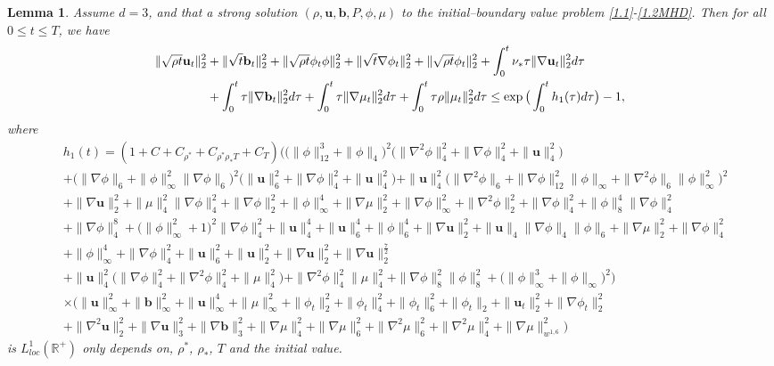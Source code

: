 \documentclass[11pt]{article}
\newtheorem{lemma}[theorem]{Lemma}
\numberwithin{equation}{section}
\begin{document}
\begin{lemma}\label{lemma3.2}
Assume \(d = 3\), and that a strong solution $(\rho,\mathbf{u},\mathbf{b},P,\phi,\mu)$ to the  initial--boundary value problem \eqref{1.1}-\eqref{1.2MHD}. Then for all \(0\leq t\leq T\), we have
\begin{align}\label{3D}
\|\sqrt{\rho t}\mathbf{u}_t\|_2^2&+\|\sqrt{t}\mathbf{b}_t\|_2^2+\|\sqrt{\rho t}\phi_t\phi\|_2^2+\|\sqrt{ t}\nabla\phi_t\|_2^2+\|\sqrt{\rho t}\phi_t\|_2^2
+\int_{0}^{t}\nu_*\tau\|\nabla \mathbf{u}_t\|_2^2d\tau\\ \notag
&+\int_{0}^{t}\tau\|\nabla \mathbf{b}_t\|_2^2d\tau+\int_{0}^{t}\tau\|\nabla\mu_t\|_2^2d\tau
+\int_{0}^{t}\tau\rho\|\mu_t\|_2^2d\tau
\leq\exp\big(\int_{0}^{t}h_1(\tau)d\tau\big)-1,
\end{align}
where
\begin{align*}
&h_1(t)=
(1 + C + C_{\rho^*} + C_{\rho^*\rho_*T} + C_T)
\Big(\big( \|\phi\|_{12}^3 + \|\phi\|_4 \big)^2
\big( \|\nabla^2 \phi\|_4^2 + \|\nabla \phi\|_4^2 + \|\mathbf{u}\|_4^2 \big) \\
&+ \big( \|\nabla \phi\|_6 + \|\phi\|_\infty^2 \|\nabla\phi\|_6 \big)^2
\big( \|\mathbf{u}\|_6^2 + \|\nabla\phi\|_4^2  + \|\mathbf{u}\|_4^2 \big) + \|\mathbf{u}\|_4^2 \big( \|\nabla^2 \phi\|_6 + \|\nabla \phi\|_{12}^2 \|\phi\|_\infty + \|\nabla^2 \phi\|_6 \|\phi\|_\infty^2 \big)^2 \\
&+ \|\nabla \mathbf{u}\|_2^2 + \| \mu\|_4^2 \|\nabla \phi\|_4^2 + \|\nabla \phi\|_2^2 + \|\phi\|_\infty^4 + \|\nabla \mu\|_2^2 + \|\nabla \phi\|_\infty^2
 + \|\nabla^2 \phi\|_2^2 + \|\nabla \phi\|_4^2 + \|\phi\|_8^4 \|\nabla\phi\|_4^2 \\
&+ \|\nabla \phi\|_4^8 + \big( \|\phi\|_\infty^2 + 1 \big)^2 \|\nabla \phi\|_4^2 + \|\mathbf{u}\|_4^4 + \|\mathbf{u}\|_6^4 + \|\phi\|_6^4 + \|\nabla \mathbf{u}\|_2^2  + \|\mathbf{u}\|_4 \|\nabla \phi\|_4 \|\phi\|_6 + \|\nabla \mu\|_2^2 + \|\nabla \phi\|_4^2\\& + \|\phi\|_\infty^4
+ \|\nabla \phi\|_4^2 + \|\mathbf{u}\|_6^2 + \|\mathbf{u}\|_2^2 + \|\nabla \mathbf{u}\|_2^2 + \|\nabla \mathbf{u}\|_2^{\frac{7}{2}} \\
&+ \|\mathbf{u}\|_4^2 \big( \|\nabla \phi\|_4^2 + \|\nabla^2 \phi\|_4^2 + \|\mu\|_4^2 \big)
+ \|\nabla^2 \phi\|_4^2 \|\mu\|_4^2 + \|\nabla \phi\|_8^2 \|\phi\|_8^2
+ \big( \|\phi\|_\infty^3 + \|\phi\|_\infty\big)^2 \Bigr)\\
&\times\Big( \|\mathbf{u}\|_{\infty}^2 +\|\mathbf{b}\|_{\infty}^2 + \|\mathbf{u}\|_{\infty}^4 + \|\mu\|_{\infty}^2 + \|\phi_t\|_2^2 + \| \phi_t\|_4^2 + \| \phi_t\|_6^2 + \|\phi_t\|_2 + \|\mathbf{u}_t\|_2^2 + \|\nabla \phi_t\|_2^2 \\
&+  \|\nabla^2 \mathbf{u}\|_2^2 + \|\nabla \mathbf{u}\|_3^2 +\|\nabla \mathbf{b}\|_3^2 + \|\nabla \mu\|_4^2 + \|\nabla \mu\|_6^2 + \|\nabla^2 \mu\|_6^2 + \|\nabla^2 \mu\|_4^2 + \|\nabla \mu\|_{w^{1,6}}^2 \Big)
\end{align*}
is $ L^1_{loc}(\mathbb{R}^+) $ only depends on, \( \rho^* \), \( \rho_* \), $T$ and the initial value.
\end{lemma}
\end{document}
